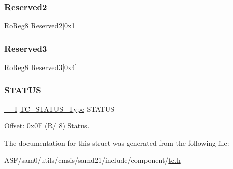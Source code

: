 \subsubsection{\texorpdfstring{Reserved2}{Reserved2}}
{\footnotesize\ttfamily \mbox{\hyperlink{group___s_a_m_d21_e15_a__definitions_ga0d957f1433aaf5d70e4dc2b68288442d}{Ro\+Reg8}} Reserved2\mbox{[}0x1\mbox{]}}

\mbox{\label{struct_tc_count32_a85a9b205a274d973876024028f9ec39b}} 
\subsubsection{\texorpdfstring{Reserved3}{Reserved3}}
{\footnotesize\ttfamily \mbox{\hyperlink{group___s_a_m_d21_e15_a__definitions_ga0d957f1433aaf5d70e4dc2b68288442d}{Ro\+Reg8}} Reserved3\mbox{[}0x4\mbox{]}}

\mbox{\label{struct_tc_count32_af7f33b0963c8311ce45fe0f929a1a9c5}} 
\subsubsection{\texorpdfstring{STATUS}{STATUS}}
{\footnotesize\ttfamily \mbox{\hyperlink{core__cm0plus_8h_af63697ed9952cc71e1225efe205f6cd3}{\+\_\+\+\_\+I}} \mbox{\hyperlink{union_t_c___s_t_a_t_u_s___type}{T\+C\+\_\+\+S\+T\+A\+T\+U\+S\+\_\+\+Type}} S\+T\+A\+T\+US}



Offset\+: 0x0F (R/ 8) Status. 



The documentation for this struct was generated from the following file\+:\begin{DoxyCompactItemize}
\item 
A\+S\+F/sam0/utils/cmsis/samd21/include/component/\mbox{\hyperlink{utils_2cmsis_2samd21_2include_2component_2tc_8h}{tc.\+h}}\end{DoxyCompactItemize}
